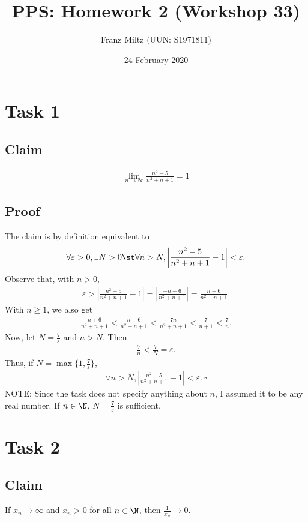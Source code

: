 \documentclass{article}
\title{PPS: Homework 2 (Workshop 33)}
\author{Franz Miltz (UUN: S1971811)}
\date{24 February 2020}
\begin{document}
\maketitle
\section*{Task 1}
\subsection*{Claim}
\begin{align*}
	\lim_{n\to\infty}\frac{n^2-5}{n^2+n+1}=1
\end{align*}
\subsection*{Proof}
The claim is by definition equivalent to
\begin{align*}
	\forall \varepsilon > 0, \exists N>0 \st \forall n>N, \left|\frac{n^2-5}{n^2+n+1}-1\right|<\varepsilon.
\end{align*}
Observe that, with $n>0$,
\begin{align*}
	\varepsilon > \left|\frac{n^2-5}{n^2+n+1}-1\right|
	=  \left|\frac{-n-6}{n^2+n+1}\right|
	=  \frac{n+6}{n^2+n+1}.
\end{align*}
With $n\geq 1$, we also get
\begin{align*}
	\frac{n+6}{n^2+n+1}<\frac{n+6}{n^2+n+1}<\frac{7n}{n^2+n+1}<\frac{7}{n+1}<\frac{7}{n}.
\end{align*}
Now, let $N=\frac{7}{\varepsilon}$ and $n>N$. Then
\begin{align*}
	\frac{7}{n}<\frac{7}{N}=\varepsilon.
\end{align*}
Thus, if $N = \max\{1, \frac{7}{\varepsilon}\}$,
\begin{align*}
	\forall n > N, \left|\frac{n^2-5}{n^2+n+1}-1\right|<\varepsilon.\:\square
\end{align*}
NOTE: Since the task does not specify anything about $n$, I assumed it to be any real number. If $n\in\N$, $N=\frac{7}{\varepsilon}$ is sufficient.
\section*{Task 2}
\subsection*{Claim}
If $x_n\to\infty$ and $x_n>0$ for all $n\in\N$, then $\frac{1}{x_n}\to 0$.
\end{document}
